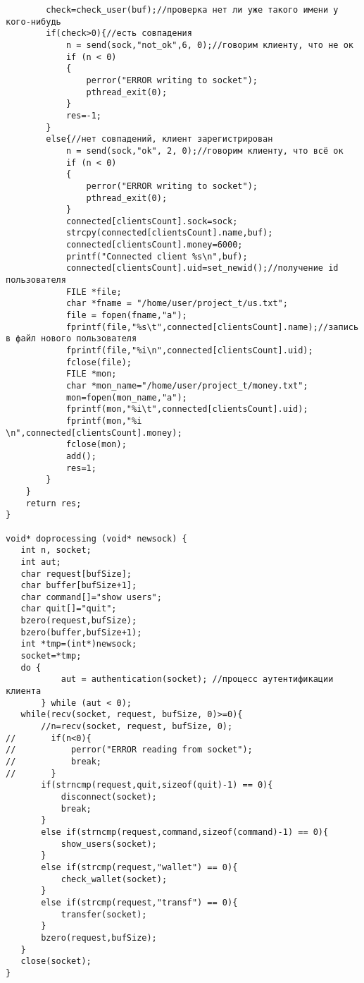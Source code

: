 \documentclass[12pt,a4paper]{report}
\begin{document}
\begin{lstlisting}
        check=check_user(buf);//проверка нет ли уже такого имени у кого-нибудь
        if(check>0){//есть совпадения
            n = send(sock,"not_ok",6, 0);//говорим клиенту, что не ок
            if (n < 0)
            {
                perror("ERROR writing to socket");
                pthread_exit(0);
            }
            res=-1;
        }
        else{//нет совпадений, клиент зарегистрирован
            n = send(sock,"ok", 2, 0);//говорим клиенту, что всё ок
            if (n < 0)
            {
                perror("ERROR writing to socket");
                pthread_exit(0);
            }
            connected[clientsCount].sock=sock;
            strcpy(connected[clientsCount].name,buf);
            connected[clientsCount].money=6000;
            printf("Connected client %s\n",buf);
            connected[clientsCount].uid=set_newid();//получение id пользователя
            FILE *file;
            char *fname = "/home/user/project_t/us.txt";
            file = fopen(fname,"a");
            fprintf(file,"%s\t",connected[clientsCount].name);//запись в файл нового пользователя
            fprintf(file,"%i\n",connected[clientsCount].uid);
            fclose(file);
            FILE *mon;
            char *mon_name="/home/user/project_t/money.txt";
            mon=fopen(mon_name,"a");
            fprintf(mon,"%i\t",connected[clientsCount].uid);
            fprintf(mon,"%i            \n",connected[clientsCount].money);
            fclose(mon);
            add();
            res=1;
        }
    }
    return res;
}

void* doprocessing (void* newsock) {
   int n, socket;
   int aut;
   char request[bufSize];
   char buffer[bufSize+1];
   char command[]="show users";
   char quit[]="quit";
   bzero(request,bufSize);
   bzero(buffer,bufSize+1);
   int *tmp=(int*)newsock;
   socket=*tmp;
   do {
           aut = authentication(socket); //процесс аутентификации клиента
       } while (aut < 0);
   while(recv(socket, request, bufSize, 0)>=0){
       //n=recv(socket, request, bufSize, 0);
//       if(n<0){
//           perror("ERROR reading from socket");
//           break;
//       }
       if(strncmp(request,quit,sizeof(quit)-1) == 0){
           disconnect(socket);
           break;
       }
       else if(strncmp(request,command,sizeof(command)-1) == 0){
           show_users(socket);
       }
       else if(strcmp(request,"wallet") == 0){
           check_wallet(socket);
       }
       else if(strcmp(request,"transf") == 0){
           transfer(socket);
       }
       bzero(request,bufSize);
   }
   close(socket);
}


\end{lstlisting}
\end{document}
